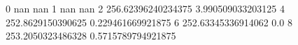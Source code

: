 0 nan nan
1 nan nan
2 256.62396240234375 3.990509033203125
4 252.8629150390625 0.229461669921875
6 252.63345336914062 0.0
8 253.2050323486328 0.5715789794921875
